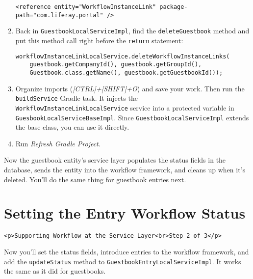 \begin{enumerate}
\begin{verbatim}
<reference entity="WorkflowInstanceLink" package-path="com.liferay.portal" />
\end{verbatim}
\item
  Back in \texttt{GuestbookLocalServiceImpl}, find the
  \texttt{deleteGuestbook} method and put this method call right before
  the \texttt{return} statement:

\begin{verbatim}
workflowInstanceLinkLocalService.deleteWorkflowInstanceLinks(
    guestbook.getCompanyId(), guestbook.getGroupId(),
    Guestbook.class.getName(), guestbook.getGuestbookId());
\end{verbatim}
\item
  Organize imports (\emph{{[}CTRL{]}+{[}SHIFT{]}+O}) and save your work.
  Then run the \texttt{buildService} Gradle task. It injects the
  \texttt{WorkflowInstanceLinkLocalService} service into a protected
  variable in \texttt{GuesbookLocalServiceBaseImpl}. Since
  \texttt{GuestbookLocalServiceImpl} extends the base class, you can use
  it directly.
\item
  Run \emph{Refresh Gradle Project}.
\end{enumerate}

Now the guestbook entity's service layer populates the status fields in
the database, sends the entity into the workflow framework, and cleans
up when it's deleted. You'll do the same thing for guestbook entries
next.

\chapter{Setting the Entry Workflow
Status}\label{setting-the-entry-workflow-status}

\begin{verbatim}
<p>Supporting Workflow at the Service Layer<br>Step 2 of 3</p>
\end{verbatim}

Now you'll set the status fields, introduce entries to the workflow
framework, and add the \texttt{updateStatus} method to
\texttt{GuestbookEntryLocalServiceImpl}. It works the same as it did for
guestbooks.


